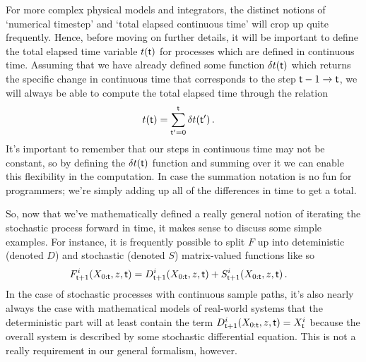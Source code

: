 For more complex physical models and integrators, the distinct notions of `numerical timestep' and `total elapsed continuous time' will crop up quite frequently. Hence, before moving on further details, it will be important to define the total elapsed time variable $t({\sf t})$ for processes which are defined in continuous time. Assuming that we have already defined some function $\delta t({\sf t})$ which returns the specific change in continuous time that corresponds to the step ${\sf t}-1 \rightarrow {\sf t}$, we will always be able to compute the total elapsed time through the relation
\begin{align}
t({\sf t}) &= \sum^{{\sf t}}_{{\sf t}'=0}\delta t({\sf t}') \label{eq:t-steps-sum} \,.
\end{align}
It's important to remember that our steps in continuous time may not be constant, so by defining the $\delta t({\sf t})$ function and summing over it we can enable this flexibility in the computation. In case the summation notation is no fun for programmers; we're simply adding up all of the differences in time to get a total.

So, now that we've mathematically defined a really general notion of iterating the stochastic process forward in time, it makes sense to discuss some simple examples. For instance, it is frequently possible to split $F$ up into deteministic (denoted $D$) and stochastic (denoted $S$) matrix-valued functions like so
\begin{align}
& F^{i}_{{\sf t}+1}(X_{0:{\sf t}},z,{\sf t}) = D^{i}_{{\sf t}+1}(X_{0:{\sf t}},z,{\sf t}) + S^{i}_{{\sf t}+1}(X_{0:{\sf t}},z,{\sf t}) \,.
\end{align}
In the case of stochastic processes with continuous sample paths, it's also nearly always the case with mathematical models of real-world systems that the deterministic part will at least contain the term $D^{i}_{{\sf t}+1}(X_{0:{\sf t}},z,{\sf t}) = X^i_{\sf t}$ because the overall system is described by some stochastic differential equation. This is not a really requirement in our general formalism, however.

